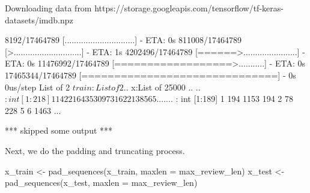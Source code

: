 \documentclass[
  12pt,
]{krantz}
\makeatletter
\newenvironment{Shaded}{\begin{snugshade}}{\end{snugshade}}
\newcommand{\AttributeTok}[1]{\textcolor[rgb]{0.61,0.61,0.61}{#1}}
\newcommand{\FunctionTok}[1]{\textcolor[rgb]{0,0,0}{#1}}
\newcommand{\NormalTok}[1]{#1}
\newcommand{\OtherTok}[1]{\textcolor[rgb]{0.37,0.37,0.37}{#1}}
\newcommand{\SpecialCharTok}[1]{\textcolor[rgb]{0,0,0}{#1}}
\newenvironment{kframe}{%
\medskip{}
\setlength{\fboxsep}{.8em}
 \def\at@end@of@kframe{}%
 \ifinner\ifhmode%
  \def\at@end@of@kframe{\end{minipage}}%
  \begin{minipage}{\columnwidth}%
 \fi\fi%
 \def\FrameCommand##1{\hskip\@totalleftmargin \hskip-\fboxsep
 \colorbox{shadecolor}{##1}\hskip-\fboxsep
     \hskip-\linewidth \hskip-\@totalleftmargin \hskip\columnwidth}%
 \MakeFramed {\advance\hsize-\width
   \@totalleftmargin\z@ \linewidth\hsize
   \@setminipage}}%
 {\par\unskip\endMakeFramed%
 \at@end@of@kframe}
\renewenvironment{Shaded}{\begin{kframe}}{\end{kframe}}
\makeatother
\begin{document}
\begin{Shaded}
\begin{Highlighting}[]
\NormalTok{Downloading data from}
\NormalTok{https://storage.googleapis.com/tensorflow/tf{-}keras{-}datasets/imdb.npz}

\NormalTok{    8192/17464789 [..............................] {-} ETA: 0s}
\NormalTok{  811008/17464789 [\textgreater{}.............................] {-} ETA: 1s}
\NormalTok{ 4202496/17464789 [======\textgreater{}.......................] {-} ETA: 0s}
\NormalTok{11476992/17464789 [==================\textgreater{}...........] {-} ETA: 0s}
\NormalTok{17465344/17464789 [==============================] {-} 0s 0us/step}
\NormalTok{List of 2}
\NormalTok{ $ train:List of 2}
\NormalTok{  ..$ x:List of 25000}
\NormalTok{  .. ..$ : int [1:218] 1 14 22 16 43 530 973 1622 1385 65 ...}
\NormalTok{  .. ..$ : int [1:189] 1 194 1153 194 2 78 228 5 6 1463 ...}
  
\NormalTok{*** skipped some output ***}
\end{Highlighting}
\end{Shaded}

\begin{Shaded}
\end{Shaded}

Next, we do the padding and truncating process.

\begin{Shaded}
\begin{Highlighting}[]
\NormalTok{x\_train }\OtherTok{\textless{}{-}} \FunctionTok{pad\_sequences}\NormalTok{(x\_train, }\AttributeTok{maxlen =}\NormalTok{ max\_review\_len)}
\NormalTok{x\_test }\OtherTok{\textless{}{-}} \FunctionTok{pad\_sequences}\NormalTok{(x\_test, }\AttributeTok{maxlen =}\NormalTok{ max\_review\_len)}
\end{Highlighting}
\end{Shaded}
\end{document}
